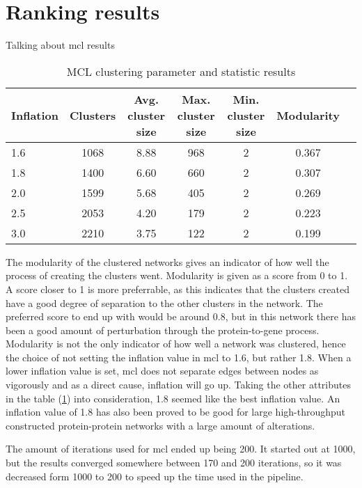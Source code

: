 \section{Ranking results}
Talking about \gls{mcl} results
\hspace*{-2cm}\begin{table}[H]
    \centering
    \begin{tabular}{| l | c | c | c | c | c | c |}
        \hline
        \textbf{Inflation} & \textbf{Clusters} & \textbf{Avg.  cluster size} &
        \textbf{Max. cluster size} & \textbf{Min. cluster size} &
        \textbf{Modularity} \\
        \hline
        1.6 & 1068 & 8.88 & 968 & 2 & 0.367 \\
        1.8 & 1400 & 6.60 & 660 & 2 & 0.307 \\
        2.0 & 1599 & 5.68 & 405 & 2 & 0.269 \\
        2.5 & 2053 & 4.20 & 179 & 2 & 0.223 \\
        3.0 & 2210 & 3.75 & 122 & 2 & 0.199 \\
        \hline
    \end{tabular}
    \caption{MCL clustering parameter and statistic results}
    \label{tab:mcl-inflation}
\end{table}
The modularity of the clustered networks gives an indicator of how well the
process of creating the clusters went. Modularity is given as a score from 0 to
1. A score closer to 1 is more preferrable, as this indicates that the clusters
created have a good degree of separation to the other clusters in the network.
The preferred score to end up with would be around 0.8, but in this network
there has been a good amount of perturbation through the protein-to-gene
process. Modularity is not the only indicator of how well a network was
clustered, hence the choice of not setting the inflation value in \gls{mcl} to
1.6, but rather 1.8. When a lower inflation value is set, \gls{mcl} does not
separate edges between nodes as vigorously and as a direct cause, inflation will
go up. Taking the other attributes in the table (\ref{tab:mcl-inflation}) into
consideration, 1.8 seemed like the best inflation value. An inflation value of
1.8 has also been proved to be good for large high-throughput constructed
protein-protein networks with a large amount of alterations\cite{mcl-inflation}.

The amount of iterations used for \gls{mcl} ended up being 200. It started out
at 1000, but the results converged somewhere between 170 and 200 iterations, so
it was decreased form 1000 to 200 to speed up the time used in the
\gls{pipeline}.

